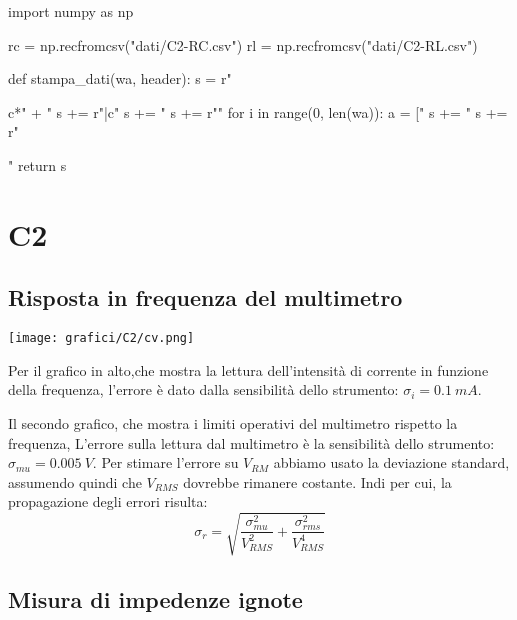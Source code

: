 \begin{sagesilent}
import numpy as np

rc = np.recfromcsv("dati/C2-RC.csv")
rl = np.recfromcsv("dati/C2-RL.csv")


def stampa_dati(wa, header):
  s = r"\begin{tabular}{c*{" + "%
  s += r"}{|c}}"
  s += "%
  s += r"\midrule"
  for i in range(0, len(wa)):
    a = ["%
    s += "%
  s += r"\end{tabular}"
  return s
\end{sagesilent}



\chapter{C2}

\section{Risposta in frequenza del multimetro}



\begin{center}
\texttt{[image: grafici/C2/cv.png]} 
\end{center}

Per il grafico in alto,che mostra la lettura dell'intensità di corrente in funzione della frequenza, l'errore è dato dalla sensibilità dello strumento: $\sigma_i = 0.1\ mA$.
\

Il secondo grafico, che mostra i limiti operativi del multimetro rispetto la frequenza, L'errore sulla lettura dal multimetro è la sensibilità dello strumento: $\sigma_{mu} = 0.005\ V$. Per stimare l'errore su $V_{RM}$ abbiamo usato la deviazione standard, assumendo quindi che $V_{RMS}$ dovrebbe rimanere costante. 
Indi per cui, la propagazione degli errori risulta:
$$\sigma_r = \sqrt{\frac{\sigma_{mu}^2}{V_{RMS}^2} + \frac{\sigma_{rms}^2}{V_{RMS}^4}}$$


\section{Misura di impedenze ignote}

